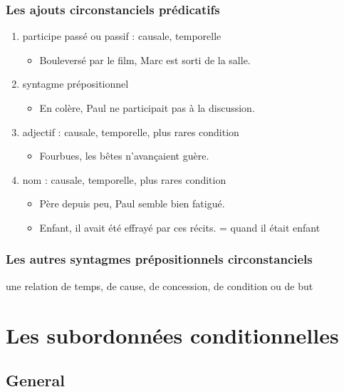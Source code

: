 \documentclass[UTF8]{report}
\begin{document}
\subsubsection{Les ajouts circonstanciels prédicatifs}
\begin{enumerate}
    \item participe passé ou passif : causale, temporelle
    \begin{itemize}
        \item Bouleversé par le film, Marc est sorti de la salle.
    \end{itemize}
    \item syntagme prépositionnel
    \begin{itemize}
        \item En colère, Paul ne participait pas à la discussion.
    \end{itemize}
    \item adjectif : causale, temporelle, plus rares condition
    \begin{itemize}
        \item Fourbues, les bêtes n’avançaient guère.
    \end{itemize}
    \item nom : causale, temporelle, plus rares condition
    \begin{itemize}
        \item Père depuis peu, Paul semble bien fatigué.
        \item Enfant, il avait été effrayé par ces récits. = quand il était enfant
    \end{itemize}
\end{enumerate}

\subsubsection{Les autres syntagmes prépositionnels circonstanciels}
une relation de temps, de cause, de concession, de condition ou de but 


\section{Les subordonnées conditionnelles}
\subsection{General}
\end{document}
